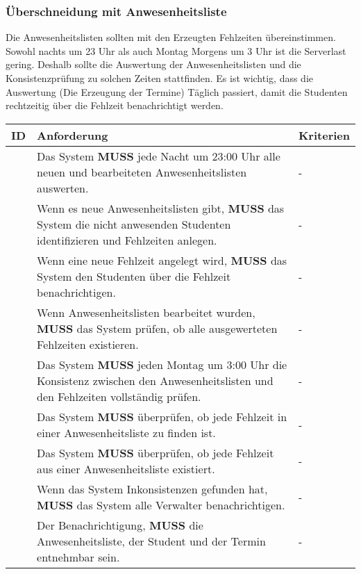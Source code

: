 \newpage

\subsubsection{Überschneidung mit Anwesenheitsliste}
Die Anwesenheitslisten sollten mit den Erzeugten Fehlzeiten übereinstimmen. Sowohl nachts um 23 Uhr als auch Montag Morgens um 3 Uhr ist die Serverlast gering. Deshalb sollte die Auswertung der Anwesenheitslisten und die Konsistenzprüfung zu solchen Zeiten stattfinden. Es ist wichtig, dass die Auswertung (Die Erzeugung der Termine) Täglich passiert, damit die Studenten rechtzeitig über die Fehlzeit benachrichtigt werden.

\vspace{12pt}

\begin{tabular} {|p{}|p{}|p{}|}
	\hline
	ID & Anforderung & Kriterien \\
	\hline
	\printfreqnr
	& Das System \textbf{MUSS} jede Nacht um 23:00 Uhr alle neuen und bearbeiteten Anwesenheitslisten auswerten. 
	& - \\
	\hline
	\printfreqnr
	& Wenn es neue Anwesenheitslisten gibt, \textbf{MUSS} das System die nicht anwesenden Studenten identifizieren und Fehlzeiten anlegen. 
	& - \\ 
	\hline
	\printfreqnr
	& Wenn eine neue Fehlzeit angelegt wird, \textbf{MUSS} das System den Studenten über die Fehlzeit benachrichtigen. 
	& - \\ 
	\hline
	\printfreqnr
	& Wenn Anwesenheitslisten bearbeitet wurden, \textbf{MUSS} das System prüfen, ob alle ausgewerteten Fehlzeiten existieren. 
	& - \\ 
	\hline
	\printfreqnr
	& Das System \textbf{MUSS} jeden Montag um 3:00 Uhr die Konsistenz zwischen den Anwesenheitslisten und den Fehlzeiten vollständig prüfen.
	& - \\ 
	\hline
	\printfreqnr
	& Das System \textbf{MUSS} überprüfen, ob jede Fehlzeit in einer Anwesenheitsliste zu finden ist.
	& - \\ 
	\hline
	\printfreqnr
	& Das System \textbf{MUSS} überprüfen, ob jede Fehlzeit aus einer Anwesenheitsliste existiert.
	& - \\ 
	\hline
	\printfreqnr
	& Wenn das System Inkonsistenzen gefunden hat, \textbf{MUSS} das System alle Verwalter benachrichtigen.
	& - \\ 
	\hline
	\printfreqnr
	& Der Benachrichtigung, \textbf{MUSS} die Anwesenheitsliste, der Student und der Termin entnehmbar sein.
	& - \\ 
	\hline
\end{tabular}

